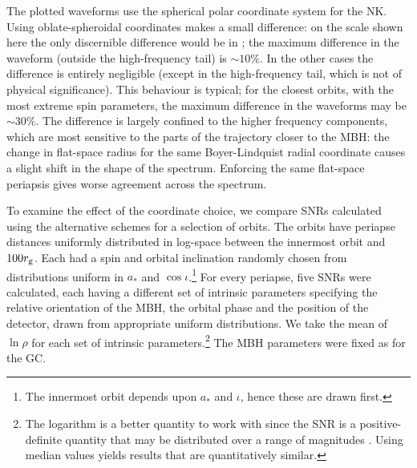 The plotted waveforms use the spherical polar coordinate system for the NK. Using oblate-spheroidal coordinates makes a small difference: on the scale shown here the only discernible difference would be in ; the maximum difference in the waveform (outside the high-frequency tail) is $\sim 10\%$. In the other cases the difference is entirely negligible (except in the high-frequency tail, which is not of physical significance). This behaviour is typical; for the closest orbits, with the most extreme spin parameters, the maximum difference in the waveforms may be $\sim 30\%$. The difference is largely confined to the higher frequency components, which are most sensitive to the parts of the trajectory closer to the MBH: the change in flat-space radius for the same Boyer-Lindquist radial coordinate causes a slight shift in the shape of the spectrum. Enforcing the same flat-space periapsis gives worse agreement across the spectrum.

To examine the effect of the coordinate choice, we compare SNRs calculated using the alternative schemes for a selection of orbits. The orbits have periapse distances uniformly distributed in log-space between the innermost orbit and $100 r_\mathrm{g}$. Each had a spin and orbital inclination randomly chosen from distributions uniform in $a_\ast$ and $\cos \iota$.\footnote{The innermost orbit depends upon $a_\ast$ and $\iota$, hence these are drawn first.} For every periapse, five SNRs were calculated, each having a different set of intrinsic parameters specifying the relative orientation of the MBH, the orbital phase and the position of the detector, drawn from appropriate uniform distributions. We take the mean of $\ln \rho$ for each set of intrinsic parameters.\footnote{The logarithm is a better quantity to work with since the SNR is a positive-definite quantity that may be distributed over a range of magnitudes \citep[sections 22.1, 23.3]{MacKay2003}. Using median values yields results that are quantitatively similar.} The MBH parameters were fixed as for the GC.

